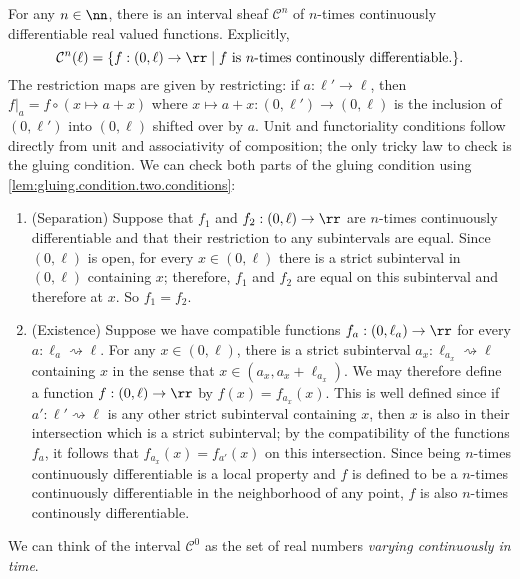 \documentclass[DynamicalBook]{subfiles}
\begin{document}
\begin{example}\label{ex:sheaf.of.cont.funcs}
  For any $n \in \nn$, there is an interval sheaf $\mathcal{C}^{n}$ of $n$-times continuously differentiable real valued functions. Explicitly,
  $$\mathcal{C}^{n}(\ell) = \{f : (0, \ell) \to \rr \mid \mbox{$f$ is $n$-times continously differentiable.}\}.$$
  The restriction maps are given by restricting: if $a : \ell' \to \ell$, then $f|_{a} = f \circ (x \mapsto a + x)$ where $x \mapsto a + x : (0, \ell') \to (0, \ell)$ is the inclusion of $(0, \ell')$ into $(0, \ell)$ shifted over by $a$. Unit and functoriality conditions follow directly from unit and associativity of composition; the only tricky law to check is the gluing condition. We can check both parts of the gluing condition using \cref{lem:gluing.condition.two.conditions}:
  \begin{enumerate}
          \item (Separation) Suppose that $f_{1}$ and $f_{2} : (0, \ell) \to \rr$ are $n$-times continuously differentiable and that their restriction to any subintervals are equal. Since $(0, \ell)$ is open, for every $x \in (0, \ell)$ there is a strict subinterval in $(0, \ell)$ containing $x$; therefore, $f_{1}$ and $f_{2}$ are equal on this subinterval and therefore at $x$. So $f_{1} = f_{2}$.
          \item (Existence) Suppose we have compatible functions $f_{a} : (0, \ell_{a}) \to \rr$ for every $a : \ell_{a} \rightsquigarrow \ell$. For any $x \in (0, \ell)$, there is a strict subinterval $a_{x} : \ell_{a_{x}} \rightsquigarrow \ell$ containing $x$ in the sense that $x \in (a_{x}, a_{x} + \ell_{a_{x}})$. We may therefore define a function $f : (0, \ell) \to \rr$ by $f(x) = f_{a_x}(x)$. This is well defined since if $a' : \ell' \rightsquigarrow \ell$ is any other strict subinterval containing $x$, then $x$ is also in their intersection which is a strict subinterval; by the compatibility of the functions $f_{a}$, it follows that $f_{a_{x}}(x) = f_{a'}(x)$ on this intersection. Since being $n$-times continuously differentiable is a local property and $f$ is defined to be a $n$-times continuously differentiable in the neighborhood of any point, $f$ is also $n$-times continously differentiable.
    \end{enumerate}

    We can think of the interval $\mathcal{C}^{0}$ as the set of real numbers \emph{varying continuously in time}.
  \end{example}
\end{document}
